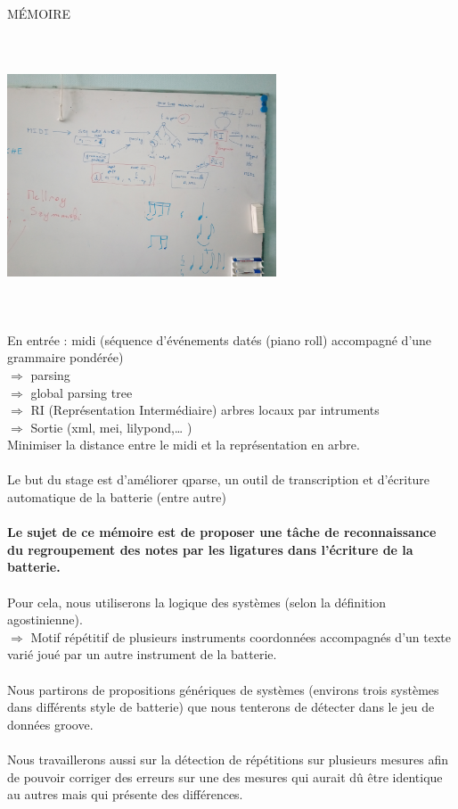 	MÉMOIRE\\\\
	\includegraphics[height=80mm, width=80mm]{images/presentation/sujet_stage.jpg} \\\\
	En entrée : midi (séquence d’événements datés (piano roll) accompagné d’une grammaire pondérée)\\
	$\Rightarrow$ parsing\\
	$\Rightarrow$ global parsing tree\\
	$\Rightarrow$ RI (Représentation Intermédiaire) arbres locaux par intruments\\
	$\Rightarrow$ Sortie (xml, mei, lilypond,… )\\
	Minimiser la distance entre le midi et la représentation en arbre.\\\\
	Le but du stage est d’améliorer qparse, un outil de transcription et d’écriture automatique de la batterie (entre autre)\\\\
	\textbf{Le sujet de ce mémoire est de proposer une tâche de reconnaissance du regroupement des notes par les ligatures dans l’écriture de la batterie.}\\\\
	Pour cela, nous utiliserons la logique des systèmes (selon la définition agostinienne).\\$\Rightarrow$ Motif répétitif de plusieurs instruments coordonnées accompagnés d’un texte varié joué par un autre instrument de la batterie.\\\\Nous partirons de propositions génériques de systèmes (environs trois systèmes dans différents style de batterie) que nous tenterons de détecter dans le jeu de données groove.\\\\
	Nous travaillerons aussi sur la détection de répétitions sur plusieurs mesures afin de pouvoir corriger des erreurs sur une des mesures qui aurait dû être identique au autres mais qui présente des différences.
	
	
	